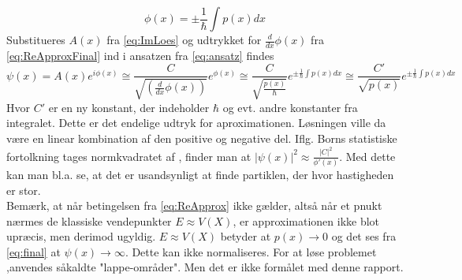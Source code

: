 %
\begin{equation}
    \phi(x) = \pm \frac{1}{\hbar} \int p(x) dx
    \label{eq:thisPhi}
\end{equation}
%
Substitueres $A(x)$ fra \cref{eq:ImLoes} og udtrykket for $\frac{d}{d x} \phi{\left (x \right )}$ fra \cref{eq:ReApproxFinal}  ind i ansatzen fra \cref{eq:ansatz} findes
%
\begin{equation}
    \psi(x) = A(x) e^{i \phi(x)} \cong
    \frac{C}{\sqrt{(\frac{d}{d x} \phi{\left (x \right )})}} e^{\phi(x)} \cong
    \frac{C}{\sqrt{\frac{p(x)}{\hbar}}} e^{\pm \frac{1}{\hbar} \int p(x) dx} \cong
    \frac{C'}{\sqrt{p(x)}} e^{\pm \frac{1}{\hbar} \int p(x) dx}
    \label{eq:final}
\end{equation}
%
Hvor $C'$ er en ny konstant, der indeholder $\hbar$ og evt. andre konstanter fra integralet. Dette er det endelige udtryk for aproximationen. Løsningen ville da være en linear kombination af den positive og negative del. Iflg. Borns statistiske fortolkning tages normkvadratet af \label{eq:final}, finder man at $|\psi(x)|^2 \approx \frac{|C|^2}{\phi'(x)}$. Med dette kan man bl.a. se, at det er usandsynligt at finde partiklen, der hvor hastigheden er stor.
\\
Bemærk, at når betingelsen fra \cref{eq:ReApprox} ikke gælder, altså når et pnukt nærmes de klassiske vendepunkter $E \approx V(X)$, er approximationen ikke blot upræcis, men derimod ugyldig. $E \approx V(X)$ betyder at $p(x) \rightarrow 0$ og det ses fra \cref{eq:final}  at $\psi(x) \rightarrow \infty$. Dette kan ikke normaliseres. For at løse problemet ,anvendes såkaldte "lappe-områder". Men det er ikke formålet med denne rapport.

